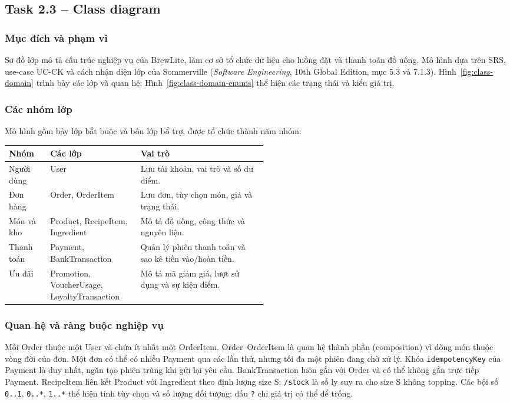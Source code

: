 \subsection{Task 2.3 -- Class diagram}

\subsubsection{Mục đích và phạm vi}
Sơ đồ lớp mô tả cấu trúc nghiệp vụ của BrewLite, làm cơ sở tổ chức dữ liệu
cho luồng đặt và thanh toán đồ uống. Mô hình dựa trên SRS, use-case UC-CK
và cách nhận diện lớp của Sommerville (\textit{Software Engineering},
10th Global Edition, mục 5.3 và 7.1.3).
Hình~\ref{fig:class-domain} trình bày các lớp và quan hệ;
Hình~\ref{fig:class-domain-enums} thể hiện các trạng thái và kiểu giá trị.

\subsubsection{Các nhóm lớp}
Mô hình gồm bảy lớp bắt buộc và bốn lớp bổ trợ, được tổ chức thành năm nhóm:

{\small
\begin{tabularx}{\linewidth}{@{}>{\raggedright\arraybackslash}p{0.16\linewidth}>{\raggedright\arraybackslash}p{0.35\linewidth}>{\raggedright\arraybackslash}X@{}}
\toprule
\textbf{Nhóm} & \textbf{Các lớp} & \textbf{Vai trò} \\
\midrule
Người dùng & User & Lưu tài khoản, vai trò và số dư điểm. \\
Đơn hàng & Order, OrderItem & Lưu đơn, tùy chọn món, giá và trạng thái. \\
Món và kho & Product, RecipeItem, Ingredient & Mô tả đồ uống, công thức và nguyên liệu. \\
Thanh toán & Payment, BankTransaction & Quản lý phiên thanh toán và sao kê tiền vào/hoàn tiền. \\
Ưu đãi & Promotion, VoucherUsage, LoyaltyTransaction & Mô tả mã giảm giá, lượt sử dụng và sự kiện điểm. \\
\bottomrule
\end{tabularx}
\par
}

\subsubsection{Quan hệ và ràng buộc nghiệp vụ}
Mỗi Order thuộc một User và chứa ít nhất một OrderItem. Order--OrderItem
là quan hệ thành phần (composition) vì dòng món thuộc vòng đời của đơn. Một đơn có thể có nhiều
Payment qua các lần thử, nhưng tối đa một phiên đang chờ xử lý.
Khóa \texttt{idempotencyKey} của Payment là duy nhất, ngăn tạo phiên trùng khi gửi lại yêu cầu.
BankTransaction luôn gắn với Order và có thể không gắn trực tiếp Payment.
RecipeItem liên kết Product với Ingredient theo định lượng size S;
\texttt{/stock} là số ly suy ra cho size S không topping. Các bội số
\texttt{0..1}, \texttt{0..*}, \texttt{1..*} thể hiện tính tùy chọn và số lượng
đối tượng; dấu \texttt{?} chỉ giá trị có thể để trống.


